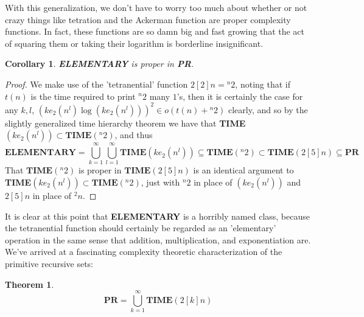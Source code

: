 \documentclass{article}
\theoremstyle{definition}
\theoremstyle{plain}
\theoremstyle{theorem}
\newtheorem{theorem}{Theorem}[section]
\newtheorem{corollary}{Corollary}[section]
\begin{document}
With this generalization, we don't have to worry too much about whether or not crazy things like tetration and the Ackerman function are proper complexity functions. In fact, these functions are so damn big and fast growing that the act of squaring them or taking their logarithm is borderline insignificant.  
\begin{corollary}
	\textbf{ELEMENTARY} is proper in \textbf{PR}.
\end{corollary}
\begin{proof}
	We make use of the 'tetranential' function $2[2]n = {}^n2$, noting that if $t(n)$ is the time required to print ${}^n2$ many $1$'s, then it is certainly the case for any $k,l$, $(ke_2(n^l)\log(ke_2(n^l)))^2 \in o(t(n)+{}^n2)$ clearly, and so by the slightly generalized time hierarchy theorem we have that \textbf{TIME}$(ke_2(n^l)) \subset \textbf{TIME}({}^n 2)$, and thus
	\[\textbf{ELEMENTARY} = \bigcup_{k=1}^{\infty}\bigcup_{l=1}^{\infty}\textbf{TIME}(ke_2(n^l)) \subseteq \textbf{TIME}({}^n 2) \subset \textbf{TIME}(2[5]n) \subseteq \textbf{PR}  \]
That $\textbf{TIME}({}^n2)$ is proper in $\textbf{TIME}(2[5]n)$ is an identical argument to \textbf{TIME}$(ke_2(n^l)) \subset \textbf{TIME}({}^n 2)$, just with ${}^n2$ in place of $(ke_2(n^l))$ and $2[5]n$ in place of ${}^2n$.
\end{proof}
It is clear at this point that \textbf{ELEMENTARY} is a horribly named class, because the tetranential function should certainly be regarded as an 'elementary' operation in the same sense that addition, multiplication, and exponentiation are. We've arrived at a fascinating complexity theoretic characterization of the primitive recursive sets:
\begin{theorem}
	\[ \textbf{PR} = \bigcup_{k=1}^{\infty}\textbf{TIME}(2[k]n) \]
\end{theorem}
\end{document}
